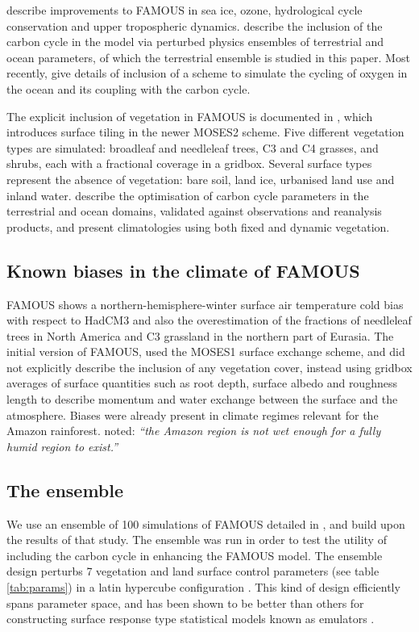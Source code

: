 \documentclass[esd, manuscript]{copernicus}
\begin{document}
\cite{smith2012famous} describe improvements to FAMOUS in sea ice, ozone, hydrological cycle conservation and upper tropospheric dynamics. \cite{williams2013optimising} describe the inclusion of the carbon cycle in the model via perturbed physics ensembles of terrestrial and ocean parameters, of which the terrestrial ensemble is studied in this paper. Most recently, \cite{williams2014oxygen} give details of inclusion of a scheme to simulate the cycling of oxygen in the ocean and its coupling with the carbon cycle.

The explicit inclusion of vegetation in FAMOUS is documented in \cite{williams2013optimising}, which introduces surface tiling in the newer MOSES2 scheme. Five different vegetation types are simulated: broadleaf and needleleaf trees, C3 and C4 grasses, and shrubs, each with a fractional coverage in a gridbox. Several surface types represent the absence of vegetation: bare soil, land ice, urbanised land use and inland water. \cite{williams2013optimising} describe the optimisation of carbon cycle parameters in the terrestrial and ocean domains, validated against observations and reanalysis products, and present climatologies using both fixed and dynamic vegetation.  

\subsection{Known biases in the climate of FAMOUS}\label{ssec:biases}

FAMOUS shows a northern-hemisphere-winter surface air temperature cold bias with respect to HadCM3 and also the overestimation of the fractions of needleleaf trees in North America and C3 grassland in the northern part of Eurasia. The initial version of FAMOUS, used the MOSES1 surface exchange scheme, and did not explicitly describe the inclusion of any vegetation cover, instead using gridbox averages of surface quantities such as root depth, surface albedo and roughness length to describe momentum and water exchange between the surface and the atmosphere. Biases were already present in climate regimes \citep{gnanadesikan2006diagnosing} relevant for the Amazon rainforest. \cite{smith2008famous} noted: \emph{``the Amazon region is not wet enough for a fully humid region to exist.''}

\subsection{The ensemble}
We use an ensemble of 100 simulations of FAMOUS detailed in \cite{williams2013optimising}, and build upon the results of that study. The ensemble was run in order to test the utility of including the carbon cycle in enhancing the FAMOUS model. The ensemble design perturbs 7 vegetation and land surface control parameters (see table \ref{tab:params}) in a latin hypercube configuration \citep{mckay1979comparison}. This kind of design efficiently spans parameter space, and has been shown to be better than others for constructing surface response type statistical models known as emulators \citep{urban2010comparison}.
\end{document}
